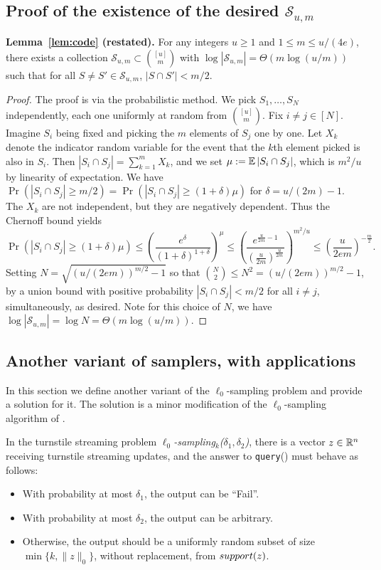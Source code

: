 \subsection{Proof of the existence of the desired $\mathcal S_{u,m}$}\label{sec:code}
\noindent \textbf{Lemma~\ref{lem:code} (restated).}
For any integers $u\ge 1$ and $1\le m\le u/(4e)$, there exists a collection $\mathcal S_{u,m} \subset \binom{[u]}m$ with $\log |\mathcal{S}_{u,m}| = \Theta(m\log(u/m))$ such that for all $S\neq S'\in \mathcal S_{u,m}$, $|S\cap S'| < m/2$.
\begin{proof}
The proof is via the probabilistic method. We pick $S_1,\ldots,S_N$ independently, each one uniformly at random from $\binom{[u]}m$. Fix $i\neq j\in[N]$. Imagine $S_i$ being fixed and picking the $m$ elements of $S_j$ one by one. Let $X_k$ denote the indicator random variable for the event that the $k$th element picked is also in $S_i$. Then $|S_i\cap S_j| = \sum_{k=1}^m X_k$, and we set $\mu:= \operatorname*{\mathbb{E}} |S_i\cap S_j|$, which is $m^2/u$ by linearity of expectation. We have $\Pr(|S_i \cap S_j| \ge m/2) = \Pr(|S_i\cap S_j| \ge (1+\delta)\mu)$ for $\delta = u/(2m) - 1$. The $X_k$ are not independent, but they are negatively dependent. Thus the Chernoff bound yields
$$
\Pr(|S_i\cap S_j| \ge (1+\delta)\mu) \le \left(\frac{e^{\delta}}{(1+\delta)^{1+\delta}}\right)^\mu \le \left(\frac{e^{\frac u{2m} - 1}}{(\frac u{2m})^{\frac u{2m}}}\right)^{m^2/u} \le \left(\frac u{2em}\right)^{-\frac m2} .
$$
Setting $N = \sqrt{(u/(2em))^{m/2} - 1}$ so that ${N \choose 2}\leq N^2=(u/(2em))^{m/2} - 1$, by a union bound with positive probability $|S_i\cap S_j| < m/2$ for all $i\neq j$, simultaneously, as desired. Note for this choice of $N$, we have $\log|\mathcal S_{u,m}| = \log N = \Theta(m\log(u/m))$.
\end{proof}

\subsection{Another variant of samplers, with applications}\label{sec:variant}

In this section we define another variant of the $\ell_0$-sampling problem and provide a solution for it. The solution is a minor modification of the $\ell_0$-sampling algorithm of \cite{JowhariST11}.

\begin{definition}
In the turnstile streaming problem {\em $\ell_0$-sampling$_k$($\delta_1,\delta_2$)}, there is a vector $z\in\mathbb{R}^n$ receiving turnstile streaming updates, and the answer to \texttt{query}() must behave as follows:
\begin{itemize}
\item With probability at most $\delta_1$, the output can be ``\textsf{Fail}''.
\item With probability at most $\delta_2$, the output can be arbitrary.
\item Otherwise, the output should be a uniformly random subset of size $\min\{k,\|z\|_0\}$, without replacement, from $\mathop{support}(z)$.
\end{itemize}
\end{definition}

